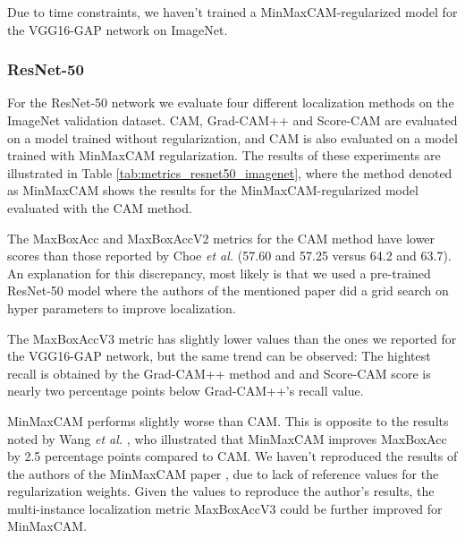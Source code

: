 Due to time constraints, we haven't trained a MinMaxCAM-regularized model for the VGG16-GAP network on ImageNet.

\subsubsection{ResNet-50}

For the ResNet-50 network we evaluate four different localization methods on the ImageNet validation dataset. CAM, Grad-CAM++ and Score-CAM are evaluated on a model trained without regularization, and  CAM is also evaluated on a model trained with MinMaxCAM regularization. The results of these experiments are illustrated in Table \ref{tab:metrics_resnet50_imagenet}, where the method denoted as MinMaxCAM shows the results for the MinMaxCAM-regularized model evaluated with the CAM method. 

The MaxBoxAcc and MaxBoxAccV2 metrics for the CAM method have lower scores than those reported by Choe \textit{et al.} (57.60 and 57.25 versus 64.2 and 63.7). An explanation for this discrepancy, most likely is that we used a pre-trained ResNet-50 model where the authors of the mentioned paper did a grid search on hyper parameters to improve localization. 

The MaxBoxAccV3 metric has slightly lower values than the ones we reported for the VGG16-GAP network, but the same trend can be observed: The hightest recall is obtained by the Grad-CAM++ method and and Score-CAM score is nearly two percentage points below Grad-CAM++'s recall value. 

MinMaxCAM performs slightly worse than CAM. This is opposite to the results noted by Wang \textit{et al.} \cite{wang2021minmaxcam}, who illustrated that MinMaxCAM improves MaxBoxAcc by 2.5 percentage points compared to CAM. We haven't reproduced the results of the authors of the MinMaxCAM paper \cite{wang2021minmaxcam}, due to lack of reference values for the regularization weights. Given the values to reproduce the author's results, the multi-instance localization metric MaxBoxAccV3 could be further improved for MinMaxCAM.

